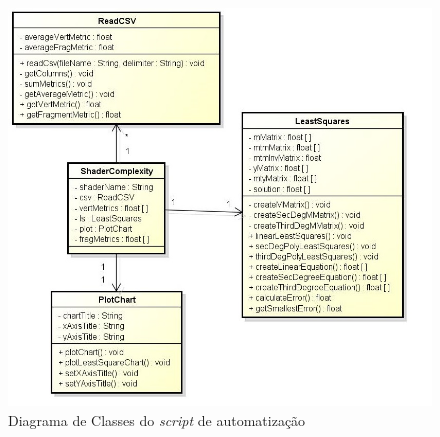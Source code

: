 	\begin{figure}[ht]
	\centering
		\includegraphics[keepaspectratio=true,scale=0.6]{figuras/minquad_diag.jpg}
	\caption{Diagrama de Classes do \textit{script} de automatização}
	\label{minquad_diag}
	\end{figure}

